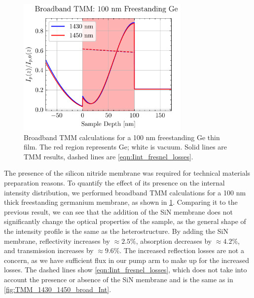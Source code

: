 \begin{figure}
	\centering
	\includegraphics[width=0.75\textwidth]{figures/chap4/Ge_1430_1450_broad_Int.pdf}
	\caption{Broadband TMM calculations for a {100 nm} freestanding Ge thin film. The red region represents Ge; white is vacuum. Solid lines are TMM results, dashed lines are \cref{eqn:Iint_fresnel_losses}.}
	\label{fig:Ge_1430_1450_broad_Int}
\end{figure}

The presence of the silicon nitride membrane was required for technical materials preparation reasons. To quantify the effect of its presence on the internal intensity distribution, we performed broadband TMM calculations for a 100 nm thick freestanding germanium membrane, as shown in \cref{fig:Ge_1430_1450_broad_Int}. Comparing it to the previous result, we can see that the addition of the SiN membrane does not significantly change the optical properties of the sample, as the general shape of the intensity profile is the same as the heterostructure. By adding the SiN membrane, reflectivity increases by $\approx 2.5\%$, absorption decreases by $\approx 4.2\%$, and transmission increases by $\approx 9.6\%$. The increased reflection losses are not a concern, as we have sufficient flux in our pump arm to make up for the increased losses. The dashed lines show \cref{eqn:Iint_fresnel_losses}, which does not take into account the presence or absence of the SiN membrane and is the same as in \cref{fig:TMM_1430_1450_broad_Int}.

